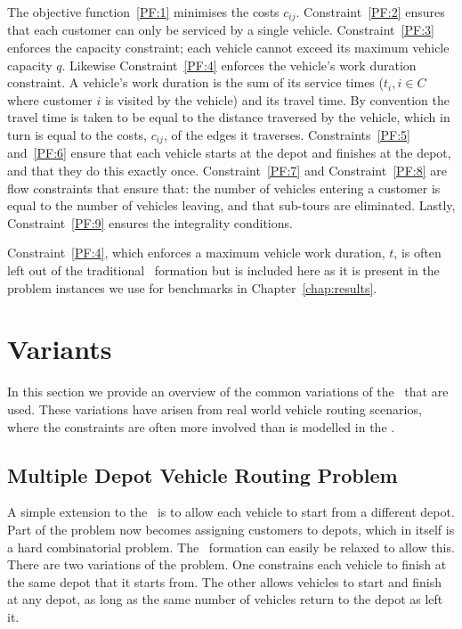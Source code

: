 The objective function~\eqref{PF:1} minimises the costs $c_{ij}$. Constraint~\eqref{PF:2} ensures that each customer can only be serviced by a single vehicle. Constraint~\eqref{PF:3} enforces the capacity constraint; each vehicle cannot exceed its maximum vehicle capacity $q$. Likewise Constraint~\eqref{PF:4} enforces the vehicle's work duration constraint. A vehicle's work duration is the sum of its service times ($t_i, i \in C$ where customer $i$ is visited by the vehicle) and its travel time. By convention the travel time is taken to be equal to the distance traversed by the vehicle, which in turn is equal to the costs, $c_{ij}$, of the edges it traverses. Constraints~\eqref{PF:5} and~\eqref{PF:6} ensure that each vehicle starts at the depot and finishes at the depot, and that they do this exactly once. Constraint~\eqref{PF:7} and Constraint~\eqref{PF:8} are flow constraints that ensure that: the number of vehicles entering a customer is equal to the number of vehicles leaving, and that sub-tours are eliminated. Lastly, Constraint~\eqref{PF:9} ensures the integrality conditions.

Constraint~\eqref{PF:4}, which enforces a maximum vehicle work duration, $t$, is often left out of the traditional \CVRP\ formation but is included here as it is present in the problem instances we use for benchmarks in Chapter~\ref{chap:results}.

\section{Variants}
\label{sec:variants}

In this section we provide an overview of the common variations of the \VRP\ that are used. These variations have arisen from real world vehicle routing scenarios, where the constraints are often more involved than is modelled in the \CVRP. 

\subsection{Multiple Depot Vehicle Routing Problem}

A simple extension to the \CVRP\ is to allow each vehicle to start from a different depot. Part of the problem now becomes assigning customers to depots, which in itself is a hard combinatorial problem. The \CVRP\ formation can easily be relaxed to allow this. There are two variations of the problem. One constrains each vehicle to finish at the same depot that it starts from. The other allows vehicles to start and finish at any depot, as long as the same number of vehicles return to the depot as left it.

